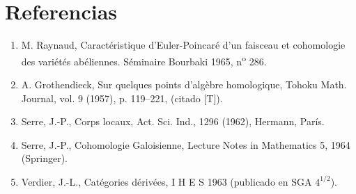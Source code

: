 \section*{Referencias}

\begin{enumerate}
\item[{[1]}] M. Raynaud, Caractéristique d'Euler-Poincaré d'un faisceau et cohomologie des variétés abéliennes. Séminaire Bourbaki 1965, n\textsuperscript{o} 286.
\item[{[2]}] A. Grothendieck, Sur quelques points d'algèbre homologique, Tohoku Math. Journal, vol. 9 (1957), p. 119--221, (citado [T]).
\item[{[3]}] Serre, J.-P., Corps locaux, Act. Sci. Ind., 1296 (1962), Hermann, París.
\item[{[4]}] Serre, J.-P., Cohomologie Galoisienne, Lecture Notes in Mathematics 5, 1964 (Springer).
\item[{[5]}] Verdier, J.-L., Catégories dérivées, I H E S 1963 (publicado en SGA $4^{1/2}$).
\end{enumerate}
